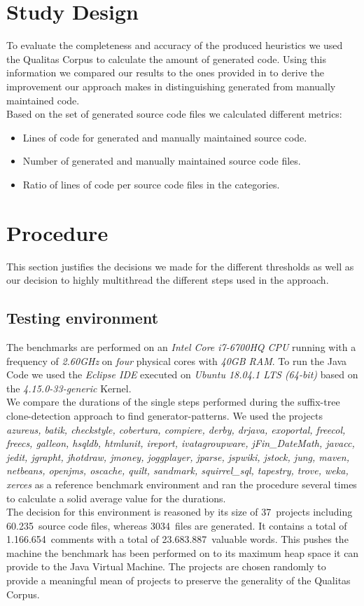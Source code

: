 \section{Study Design}
To evaluate the completeness and accuracy of the produced heuristics we used the Qualitas Corpus to calculate the amount of generated code. Using this information we compared our results to the ones provided in \cite{Bernwieser2014} to derive the improvement our approach makes in distinguishing generated from manually maintained code.\\
Based on the set of generated source code files we calculated different metrics:
\begin{itemize}
	\item Lines of code for generated and manually maintained source code.
	\item Number of generated and manually maintained source code files.
	\item Ratio of lines of code per source code files in the categories.
\end{itemize}

\section{Procedure}
This section justifies the decisions we made for the different thresholds as well as our decision to highly multithread the different steps used in the approach.

\subsection{Testing environment}
The benchmarks are performed on an \textit{Intel Core i7-6700HQ CPU} running with a frequency of \textit{2.60GHz} on \textit{four} physical cores with \textit{40GB RAM}. To run the Java Code we used the \textit{Eclipse IDE}  executed on \textit{Ubuntu 18.04.1 LTS (64-bit)} based on the \textit{4.15.0-33-generic} Kernel.\\
We compare the durations of the single steps performed during the suffix-tree clone-detection approach to find generator-patterns. We used the projects \textit{azureus, batik, checkstyle, cobertura, compiere, derby, drjava, exoportal, freecol, freecs, galleon, hsqldb, htmlunit, ireport, ivatagroupware, jFin\_DateMath, javacc, jedit, jgrapht, jhotdraw, jmoney, joggplayer, jparse, jspwiki, jstock, jung, maven, netbeans, openjms, oscache, quilt, sandmark, squirrel\_sql, tapestry, trove, weka, xerces} as a reference benchmark environment and ran the procedure several times to calculate a solid average value for the durations. \\
The decision for this environment is reasoned by its size of 37~projects including 60.235~source code files, whereas 3034~files are generated. It contains a total of 1.166.654~comments with a total of 23.683.887~valuable words. This pushes the machine the benchmark has been performed on to its maximum heap space it can provide to the Java Virtual Machine. The projects are chosen randomly to provide a meaningful mean of projects to preserve the generality of the Qualitas Corpus.

